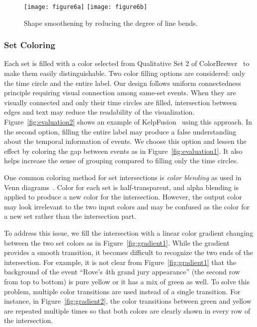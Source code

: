 \begin{figure}[ht]
	\centering
		{\texttt{[image: figure6a]}}
	\hfill
		{\texttt{[image: figure6b]}}
	\caption{Shape smoothening by reducing the degree of line bends.}
	\label{fig:generation}
\end{figure}

\subsubsection{Set Coloring}
Each set is filled with a color selected from Qualitative Set 2 of ColorBrewer~\cite{Harrower2003} to make them easily distinguishable. Two color filling options are considered: only the time circle and the entire label. Our design follows uniform connectedness principle requiring visual connection among same-set events. When they are visually connected and only their time circles are filled, intersection between edges and text may reduce the readability of the visualization. Figure~\ref{fig:evaluation2} shows an example of KelpFusion~\cite{Meulemans2013} using this approach. In the second option, filling the entire label may produce a false understanding about the temporal information of events. We choose this option and lessen the effect by coloring the gap between events as in Figure~\ref{fig:evaluation1}. It also helps increase the sense of grouping compared to filling only the time circles.

One common coloring method for set intersections is \emph{color blending} as used in Venn diagrams~\cite{Ware2013}. Color for each set is half-transparent, and alpha blending is applied to produce a new color for the intersection. However, the output color may look irrelevant to the two input colors and may be confused as the color for a new set rather than the intersection part.

To address this issue, we fill the intersection with a linear color gradient changing between the two set colors as in Figure~\ref{fig:gradient1}. While the gradient provides a smooth transition, it becomes difficult to recognize the two ends of the intersection. For example, it is not clear from Figure~\ref{fig:gradient1} that the background of the event ``Rove's 4th grand jury appearance'' (the second row from top to bottom) is pure yellow or it has a mix of green as well. To solve this problem, multiple color transitions are used instead of a single transition. For instance, in Figure~\ref{fig:gradient2}, the color transitions between green and yellow are repeated multiple times so that both colors are clearly shown in every row of the intersection.

